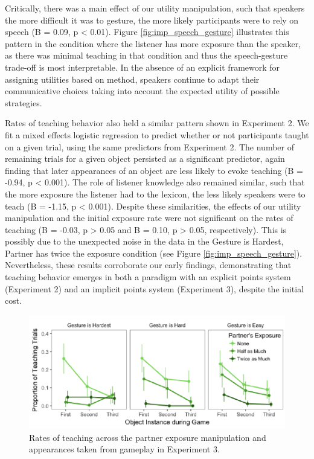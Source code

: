 \documentclass[10pt, letterpaper]{article}
\newenvironment{CodeChunk}{}{}
\begin{document}
Critically, there was a main effect of our utility manipulation, such
that speakers the more difficult it was to gesture, the more likely
participants were to rely on speech (B = 0.09, p \textless{} 0.01).
Figure \ref{fig:imp_speech_gesture} illustrates this pattern in the
condition where the listener has more exposure than the speaker, as
there was minimal teaching in that condition and thus the speech-gesture
trade-off is most interpretable. In the absence of an explicit framework
for assigning utilities based on method, speakers continue to adapt
their communicative choices taking into account the expected utility of
possible strategies.

Rates of teaching behavior also held a similar pattern shown in
Experiment 2. We fit a mixed effects logistic regression to predict
whether or not participants taught on a given trial, using the same
predictors from Experiment 2. The number of remaining trials for a given
object persisted as a significant predictor, again finding that later
appearances of an object are less likely to evoke teaching (B = -0.94, p
\textless{} 0.001). The role of listener knowledge also remained
similar, such that the more exposure the listener had to the lexicon,
the less likely speakers were to teach (B = -1.15, p \textless{} 0.001).
Despite these similarities, the effects of our utility manipulation and
the initial exposure rate were not significant on the rates of teaching
(B = -0.03, p \textgreater{} 0.05 and B = 0.10, p \textgreater{} 0.05,
respectively). This is possibly due to the unexpected noise in the data
in the Gesture is Hardest, Partner has twice the exposure condition (see
Figure \ref{fig:imp_speech_gesture}). Nevertheless, these results
corroborate our early findings, demonstrating that teaching behavior
emerges in both a paradigm with an explicit points system (Experiment 2)
and an implicit points system (Experiment 3), despite the initial cost.

\begin{CodeChunk}
\begin{figure}[H]

{\centering \includegraphics{figs/imp_teach-1} 

}

\caption[Rates of teaching across the partner exposure manipulation and appearances taken from gameplay in Experiment 3]{Rates of teaching across the partner exposure manipulation and appearances taken from gameplay in Experiment 3.}\label{fig:imp_teach}
\end{figure}
\end{CodeChunk}
\end{document}
